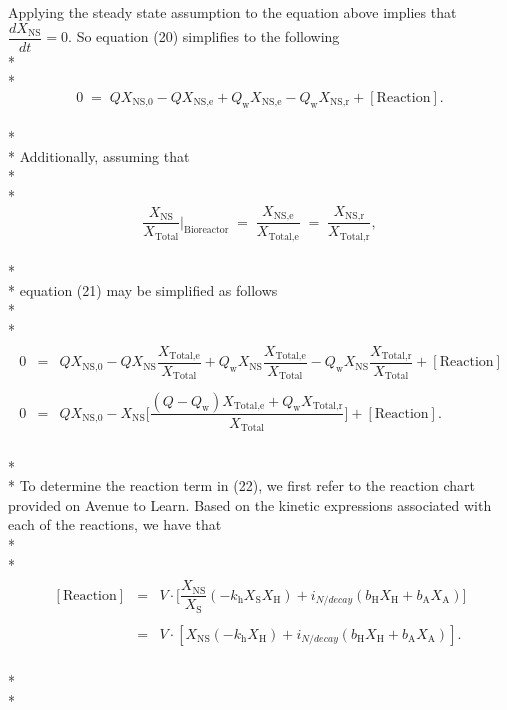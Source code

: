 \documentclass[]{article}
\begin{document}
Applying the steady state assumption to the equation above implies that $\dfrac{dX_{\text{NS}}}{dt}=0$. So equation (20) simplifies to the following \\* \\* 
\begin{equation}
0 \; = \; QX_{\text{NS,0}} - QX_{\text{NS,e}} + Q_{\text{w}}X_{\text{NS,e}} - Q_{\text{w}}X_{\text{NS,r}} + [\text{Reaction}].
\end{equation} \\* \\*
Additionally, assuming that \\* \\* 
\begin{equation}
\nonumber
\dfrac{X_{\text{NS}}}{X_{\text{Total}}}\biggr\rvert_{\text{Bioreactor}} \; = \; \dfrac{X_{\text{NS,e}}}{X_{\text{Total,e}}} \; = \; \dfrac{X_{\text{NS,r}}}{X_{\text{Total,r}}}, 
\end{equation} \\* \\* 
equation (21) may be simplified as follows \\* \\* 
\begin{align}
\begin{array}{rcl}
0 &=& QX_{\text{NS,0}} - QX_{\text{NS}}\dfrac{X_{\text{Total,e}}}{X_{\text{Total}}} + Q_{\text{w}}X_{\text{NS}}\dfrac{X_{\text{Total,e}}}{X_{\text{Total}}} - Q_{\text{w}}X_{\text{NS}}\dfrac{X_{\text{Total,r}}}{X_{\text{Total}}} + [\text{Reaction}] \\ \\
0 &=& QX_{\text{NS,0}} - X_{\text{NS}} \Bigg[\dfrac{(Q-Q_{\text{w}})X_{\text{Total,e}} + Q_{\text{w}}X_{\text{Total,r}}}{X_{\text{Total}}}\Bigg] + [\text{Reaction}].
\end{array}
\end{align} \\* \\* 
To determine the reaction term in (22), we first refer to the reaction chart provided on Avenue to Learn. Based on the kinetic expressions associated with each of the reactions, we have that \\* \\* 
\begin{align}
\begin{array}{rcl}
[\text{Reaction}] &=& V \cdot \Bigg[\dfrac{X_{\text{NS}}}{X_{\text{S}}}(-k_{\text{h}}X_{\text{S}}X_{\text{H}}) + i_{N/decay}(b_{\text{H}}X_{\text{H}}+b_{\text{A}}X_{\text{A}})\Bigg] \\ \\
&=& V \cdot [X_{\text{NS}}(-k_{\text{h}}X_{\text{H}}) + i_{N/decay}(b_{\text{H}}X_{\text{H}}+b_{\text{A}}X_{\text{A}})].
\end{array}
\end{align} \\* \\*
\end{document}
